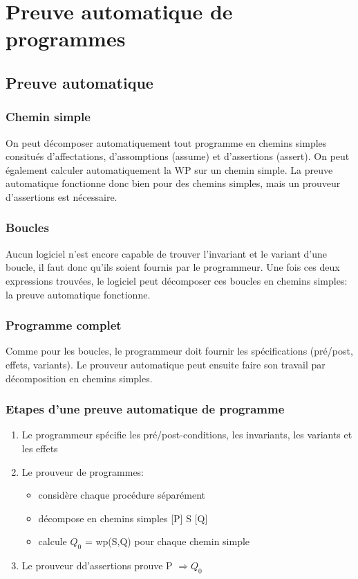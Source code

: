 \section{Preuve automatique de programmes}

\subsection{Preuve automatique}
\subsubsection{Chemin simple}
On peut décomposer automatiquement tout programme en chemins simples consitués d'affectations, d'assomptions (assume) et d'assertions (assert). On peut également calculer automatiquement la WP sur un chemin simple. La preuve automatique fonctionne donc bien pour des chemins simples, mais un prouveur d'assertions est nécessaire.

\subsubsection{Boucles}
Aucun logiciel n'est encore capable de trouver l'invariant et le variant d'une boucle, il faut donc qu'ils soient fournis par le programmeur. Une fois ces deux expressions trouvées, le logiciel peut décomposer ces boucles en chemins simples: la preuve automatique fonctionne.

\subsubsection{Programme complet}
Comme pour les boucles, le programmeur doit fournir les spécifications (pré/post, effets, variants). Le prouveur automatique peut ensuite faire son travail par décomposition en chemins simples. 

\subsubsection{Etapes d'une preuve automatique de programme}
\begin{enumerate}

	\item Le programmeur spécifie les pré/post-conditions, les invariants, les variants et les effets
	\item Le prouveur de programmes: 
		\begin{itemize}
			\item considère chaque procédure séparément
			\item décompose en chemins simples [P] S [Q]
			\item calcule $Q_0$ = wp(S,Q) pour chaque chemin simple
		\end{itemize}
	\item Le prouveur dd'assertions prouve P $\Rightarrow Q_0$ 
\end{enumerate}

